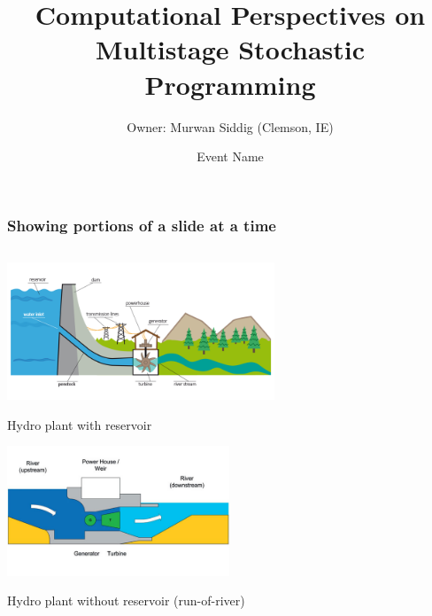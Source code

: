 \documentclass{beamer}
\title[Computational Perspectives on MSP] %
{Computational Perspectives on Multistage Stochastic Programming}
\author[Siddig] %
{Owner: Murwan Siddig (Clemson, IE)}
\institute[Clemson]
\date[Nov. 9, 2020]{Event Name} %
\newcommand{\exclude}[1]{}
\begin{document}
\begin{frame}
  \titlepage
\end{frame}

\exclude{
\begin{frame}{This slide is not shown at all}

\end{frame}
}

\begin{frame}
\frametitle{Showing portions of a slide at a time}
\vspace{-0.45cm}
\begin{columns}
\begin{column}{0.7\textwidth}
\begin{center}
\includegraphics[width=0.6\textwidth]{hydro-with-reservior.png}
\begin{footnotesize}
\vspace{-0.3cm}

Hydro plant with reservoir

\end{footnotesize}

\includegraphics[width=0.5\textwidth]{hydro-without-reservoir}

\begin{footnotesize}
\vspace{-0.3cm}
Hydro plant without reservoir (run-of-river)


\end{footnotesize}
\end{center}
\end{column}
\end{columns}
\end{frame}
\end{document}
